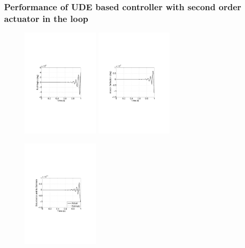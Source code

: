 \documentclass[table,10pt,red]{beamer}	%
\begin{document}
\begin{frame} 
\frametitle{Performance of UDE based controller with second order actuator in the loop}

\begin{figure}
\includegraphics[width=3.7cm]{fig5a}
\includegraphics[width=3.7cm]{fig5b}
\begin{center}
\includegraphics[width=3.7cm]{fig5c}
\end{center}
\end{figure}
\end{frame}
\end{document}
